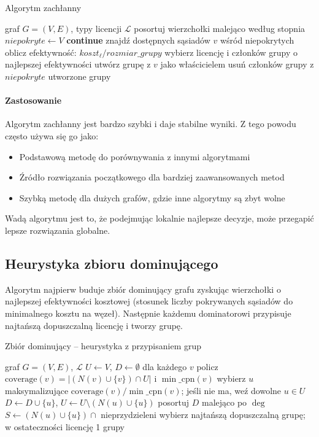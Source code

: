 \begin{algorithm}[H]
\caption{Algorytm zachłanny}
\label{alg:greedy}
\begin{algorithmic}[1]
\Require graf $G=(V,E)$, typy licencji $\mathcal{L}$
\State posortuj wierzchołki malejąco według stopnia
\State $niepokryte \gets V$
   \textbf{continue} \EndIf
  \State znajdź dostępnych sąsiadów $v$ wśród niepokrytych
    \State oblicz efektywność: $koszt_\ell / rozmiar\_grupy$
  \EndFor
  \State wybierz licencję i członków grupy o najlepszej efektywności
  \State utwórz grupę z $v$ jako właścicielem
  \State usuń członków grupy z $niepokryte$
\EndFor
\State \Return utworzone grupy
\end{algorithmic}
\end{algorithm}

\paragraph{Zastosowanie}
Algorytm zachłanny jest bardzo szybki i daje stabilne wyniki. Z tego powodu często używa się go jako:
\begin{itemize}
  \item Podstawową metodę do porównywania z innymi algorytmami
  \item Źródło rozwiązania początkowego dla bardziej zaawansowanych metod
  \item Szybką metodę dla dużych grafów, gdzie inne algorytmy są zbyt wolne
\end{itemize}
Wadą algorytmu jest to, że podejmując lokalnie najlepsze decyzje, może przegapić lepsze rozwiązania globalne.

\subsection{Heurystyka zbioru dominującego}\label{subsec:ds}

Algorytm najpierw buduje zbiór dominujący grafu zyskując wierzchołki o najlepszej efektywności kosztowej (stosunek liczby pokrywanych sąsiadów do minimalnego kosztu na węzeł). Następnie każdemu dominatorowi przypisuje najtańszą dopuszczalną licencję i tworzy grupę.

\begin{algorithm}[H]
\caption{Zbiór dominujący -- heurystyka z przypisaniem grup}
\label{alg:ds}
\begin{algorithmic}[1]
\Require graf $G=(V,E)$, $\mathcal{L}$
\State $U\gets V$, $D\gets\emptyset$
  \State dla każdego $v$ policz $\mathrm{coverage}(v)=|(N(v)\cup\{v\})\cap U|$ i $\min\_\mathrm{cpn}(v)$
  \State wybierz $u$ maksymalizujące $\mathrm{coverage}(v)/\min\_\mathrm{cpn}(v)$; jeśli nie ma, weź dowolne $u\in U$
  \State $D\gets D\cup\{u\}$, $U\gets U\setminus(N(u)\cup\{u\})$
\EndWhile
\State posortuj $D$ malejąco po $\deg$
  \State $S\gets(N(u)\cup\{u\})\cap$ nieprzydzieleni
  \State wybierz najtańszą dopuszczalną grupę; w ostateczności licencję 1
\EndFor
\State \Return grupy
\end{algorithmic}
\end{algorithm}

